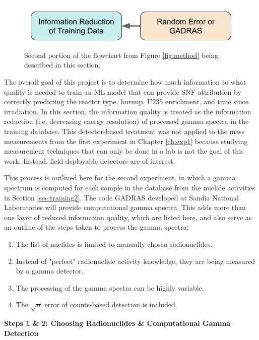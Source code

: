 \begin{figure}[H]
  \centering
  \includegraphics[width=0.7\linewidth]{./chapters/exp1/methodology2.png}
  \caption{Second portion of the flowchart from Figure \ref{fig:method} being 
           described in this section.}
\end{figure}

The overall goal of this project is to determine how much information to what
quality is needed to train an  \gls{ML}
model that can provide \gls{SNF} attribution by correctly predicting the
reactor type, burnup, \gls{U235} enrichment, and time since irradiation.  In
this section, the information quality is treated as the information reduction
(i.e. decreasing energy resolution) of processed gamma spectra in the training
database.  This detector-based treatment was not applied to the mass
measurements from the first experiment in Chapter \ref{ch:exp1} because
studying measurement techniques that can only be done in a lab is not the goal
of this work.  Instead, field-deployable detectors are of interest.

This process is outlined here for the second experiment, in which a gamma
spectrum is computed for each sample in the database from the nuclide
activities in Section \ref{sec:training2}.  The code \gls{GADRAS} \cite{gadras}
developed at Sandia National Laboratories will provide computational gamma
spectra.  This adds more than one layer of reduced information quality, which
are listed here, and also serve as an outline of the steps taken to process the 
gamma spectra:
\begin{enumerate}
  \item \label{itm:1} The list of nuclides is limited to manually chosen 
        radionuclides.
  \item \label{itm:2} Instead of "perfect" radionuclide activity knowledge, 
        they are being measured by a gamma detector.
  \item \label{itm:3} The processing of the gamma spectra can be highly variable.
  \item \label{itm:4} The $\sqrt{n}$ error of counts-based detection is included. 
\end{enumerate}

\noindent \textbf{Steps 1 \& 2: Choosing Radionuclides \& Computational Gamma Detection}

